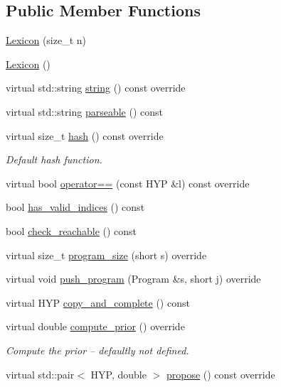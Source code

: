 \subsection*{Public Member Functions}
\begin{DoxyCompactItemize}
\item 
\hyperlink{class_lexicon_a06bafc4711d145a026fe03e9e1168ae8}{Lexicon} (size\+\_\+t n)
\item 
\hyperlink{class_lexicon_ab027c90715b8616af424c6682cdfef0f}{Lexicon} ()
\item 
virtual std\+::string \hyperlink{class_lexicon_a5c584d2885a21542082332a26eb0961b}{string} () const override
\item 
virtual std\+::string \hyperlink{class_lexicon_a0ed99caee19dc82e57e80b290abd239a}{parseable} () const
\item 
virtual size\+\_\+t \hyperlink{class_lexicon_afbefa510e623ee4a407a1e1e04f42fb2}{hash} () const override
\begin{DoxyCompactList}\small\item\em Default hash function. \end{DoxyCompactList}\item 
virtual bool \hyperlink{class_lexicon_abd4b0dead3757288e80f37773820f513}{operator==} (const H\+YP \&l) const override
\item 
bool \hyperlink{class_lexicon_a7b8ca67607285cc14608bd7148953d91}{has\+\_\+valid\+\_\+indices} () const
\item 
bool \hyperlink{class_lexicon_a1e58bf42fb2388eff629bc899d8ef5ed}{check\+\_\+reachable} () const
\item 
virtual size\+\_\+t \hyperlink{class_lexicon_a005225141f8a245fe33d8f0a58fd397a}{program\+\_\+size} (short s) override
\item 
virtual void \hyperlink{class_lexicon_acd367c70ccc583f2a9fcbb1d007db45c}{push\+\_\+program} (Program \&s, short j) override
\item 
virtual H\+YP \hyperlink{class_lexicon_a9c1bf25acf10591531c3a9f49f2cfd57}{copy\+\_\+and\+\_\+complete} () const
\item 
virtual double \hyperlink{class_lexicon_a2e099a68dd08d62897b40647f92eba1c}{compute\+\_\+prior} () override
\begin{DoxyCompactList}\small\item\em Compute the prior -- defaultly not defined. \end{DoxyCompactList}\item 
virtual std\+::pair$<$ H\+YP, double $>$ \hyperlink{class_lexicon_afa8ea51bbd16df5f46557fe10db84980}{propose} () const override

\end{DoxyCompactItemize}

